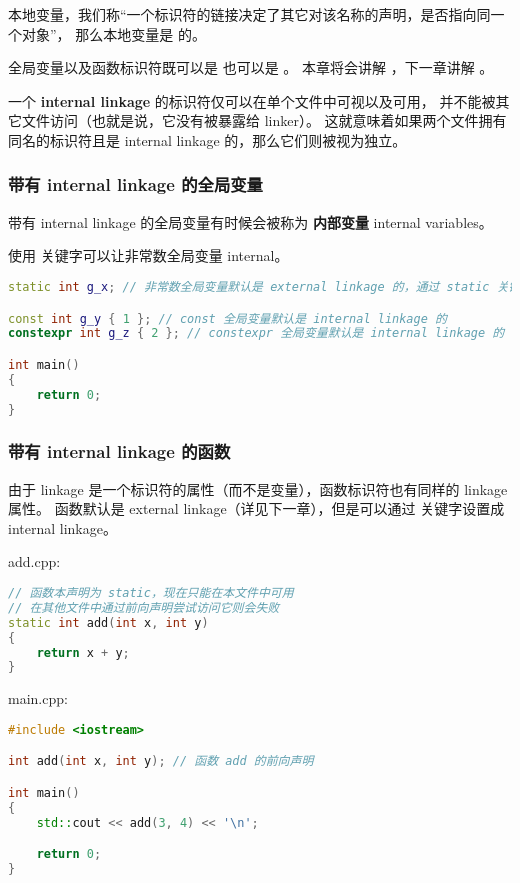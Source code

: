 \documentclass[../../LearnCpp.tex]{subfiles}
\begin{document}

本地变量，我们称“一个标识符的链接决定了其它对该名称的声明，是否指向同一个对象”，
那么本地变量是  的。

全局变量以及函数标识符既可以是  也可以是 。
本章将会讲解 ，下一章讲解 。

一个 \textbf{internal linkage} 的标识符仅可以在单个文件中可视以及可用，
并不能被其它文件访问（也就是说，它没有被暴露给 linker）。
这就意味着如果两个文件拥有同名的标识符且是 internal linkage 的，那么它们则被视为独立。

\subsubsection*{带有 internal linkage 的全局变量}

带有 internal linkage 的全局变量有时候会被称为 \textbf{内部变量} internal variables。

使用  关键字可以让非常数全局变量 internal。

\begin{lstlisting}[language=C++]
static int g_x; // 非常数全局变量默认是 external linkage 的，通过 static 关键字使其变为 internal linkage

const int g_y { 1 }; // const 全局变量默认是 internal linkage 的
constexpr int g_z { 2 }; // constexpr 全局变量默认是 internal linkage 的

int main()
{
    return 0;
}
\end{lstlisting}

\subsubsection*{带有 internal linkage 的函数}

由于 linkage 是一个标识符的属性（而不是变量），函数标识符也有同样的 linkage 属性。
函数默认是 external linkage（详见下一章），但是可以通过  关键字设置成 internal linkage。

add.cpp:

\begin{lstlisting}[language=C++]
// 函数本声明为 static，现在只能在本文件中可用
// 在其他文件中通过前向声明尝试访问它则会失败
static int add(int x, int y)
{
    return x + y;
}
\end{lstlisting}

main.cpp:

\begin{lstlisting}[language=C++]
#include <iostream>

int add(int x, int y); // 函数 add 的前向声明

int main()
{
    std::cout << add(3, 4) << '\n';

    return 0;
}
\end{lstlisting}
\end{document}
